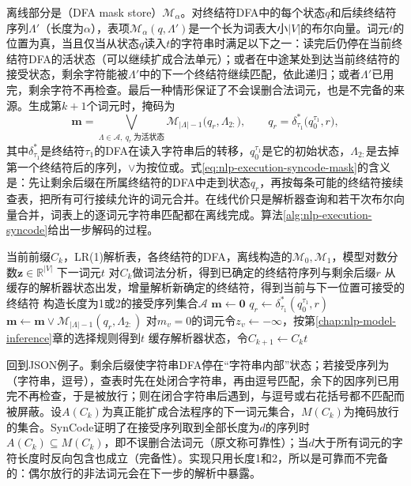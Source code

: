 离线部分是（DFA mask store）$\mathcal M_{\alpha}$。对终结符DFA中的每个状态$q$和后续终结符序列$\Lambda'$（长度为$\alpha$），表项$\mathcal M_{\alpha}(q,\Lambda')$是一个长为词表大小$|V|$的布尔向量。词元$t$的位置为真，当且仅当从状态$q$读入$t$的字符串时满足以下之一：读完后仍停在当前终结符DFA的活状态（可以继续扩成合法单元）；或者在中途某处到达当前终结符的接受状态，剩余字符能被$\Lambda'$中的下一个终结符继续匹配，依此递归；或者$\Lambda'$已用完，剩余字符不再检查。最后一种情形保证了不会误删合法词元，也是不完备的来源。生成第$k+1$个词元时，掩码为
\begin{equation}
 \bm m=\bigvee_{\Lambda\in\mathcal A,\ q_r\ \text{为活状态}}\mathcal M_{|\Lambda|-1}\bigl(q_r,\Lambda_{2:}\bigr),
 \qquad q_r=\delta^*_{\tau_1}\bigl(q_0^{\tau_1},r\bigr),
 \label{eq:nlp-execution-syncode-mask}
\end{equation}
其中$\delta^*_{\tau_1}$是终结符$\tau_1$的DFA在读入字符串后的转移，$q_0^{\tau_1}$是它的初始状态，$\Lambda_{2:}$是去掉第一个终结符后的序列，$\vee$为按位或。式\eqref{eq:nlp-execution-syncode-mask}的含义是：先让剩余后缀在所属终结符的DFA中走到状态$q_r$，再按每条可能的终结符接续查表，把所有可行接续允许的词元合并。在线代价只是解析器查询和若干次布尔向量合并，词表上的逐词元字符串匹配都在离线完成。算法\ref{alg:nlp-execution-syncode}给出一步解码的过程。

\begin{algorithm}[SynCode的一步约束解码]
  \label{alg:nlp-execution-syncode}
  \begin{algorithmic}[1]
    \Require 当前前缀$C_k$，LR(1)解析表，各终结符的DFA，离线构造的$\mathcal M_0,\mathcal M_1$，模型对数分数$\bm z\in\mathbb R^{|V|}$
    \Ensure 下一词元$t$
    \State 对$C_k$做词法分析，得到已确定的终结符序列与剩余后缀$r$
    \State 从缓存的解析器状态出发，增量解析新确定的终结符，得到当前与下一位置可接受的终结符
    \State 构造长度为1或2的接受序列集合$\mathcal A$
    \State $\bm m\gets\bm 0$
      \State $q_r\gets\delta^*_{\tau_1}(q_0^{\tau_1},r)$
        \State $\bm m\gets\bm m\vee\mathcal M_{|\Lambda|-1}(q_r,\Lambda_{2:})$
      \EndIf
    \EndFor
    \State 对$m_v=0$的词元令$z_v\gets-\infty$，按第\ref{chap:nlp-model-inference}章的选择规则得到$t$
    \State 缓存解析器状态，令$C_{k+1}\gets C_kt$
  \end{algorithmic}
\end{algorithm}

回到JSON例子。剩余后缀使字符串DFA停在“字符串内部”状态；若接受序列为（字符串，逗号），查表时先在处闭合字符串，再由逗号匹配\code{,}，余下的因序列已用完不再检查，于是被放行；\code{18"]}则在闭合字符串后遇到\code{]}，与逗号或右花括号都不匹配而被屏蔽。设$A(C_k)$为真正能扩成合法程序的下一词元集合，$M(C_k)$为掩码放行的集合。SynCode证明了在接受序列取到全部长度为$d$的序列时$A(C_k)\subseteq M(C_k)$，即不误删合法词元（原文称可靠性）；当$d$大于所有词元的字符长度时反向包含也成立（完备性）。实现只用长度1和2，所以是可靠而不完备的：偶尔放行的非法词元会在下一步的解析中暴露。

